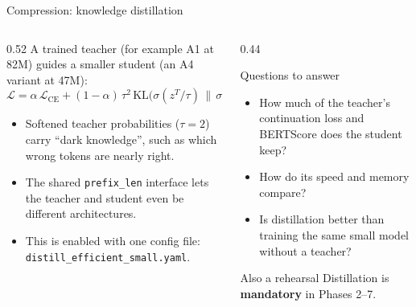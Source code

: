 \documentclass[aspectratio=169,11pt]{beamer}
\newcommand{\code}[1]{\texttt{\small #1}}
\begin{document}
\begin{frame}{Compression: knowledge distillation}
  \begin{columns}[T]
    \begin{column}{0.52\textwidth}
      \small
      A trained teacher (for example A1 at 82M) guides a smaller student (an A4 variant at 47M):
      \[
        \mathcal{L}=\alpha\,\mathcal{L}_{\text{CE}}+(1-\alpha)\,\tau^2\,
        \mathrm{KL}\!\big(\sigma(z^{T}/\tau)\,\|\,\sigma(z^{S}/\tau)\big)
      \]
      \begin{itemize}
        \item Softened teacher probabilities ($\tau=2$) carry ``dark knowledge'', such as which wrong tokens are nearly right.
        \item The shared \code{prefix\_len} interface lets the teacher and student even be different architectures.
        \item This is enabled with one config file: \code{distill\_efficient\_small.yaml}.
      \end{itemize}
    \end{column}
    \begin{column}{0.44\textwidth}
      \begin{block}{Questions to answer}
        \small
        \begin{itemize}
          \item How much of the teacher's continuation loss and BERTScore does the student keep?
          \item How do its speed and memory compare?
          \item Is distillation better than training the same small model without a teacher?
        \end{itemize}
      \end{block}
      \begin{exampleblock}{Also a rehearsal}
        \small
        Distillation is \textbf{mandatory} in Phases 2--7.
      \end{exampleblock}
    \end{column}
  \end{columns}
\end{frame}
\end{document}

